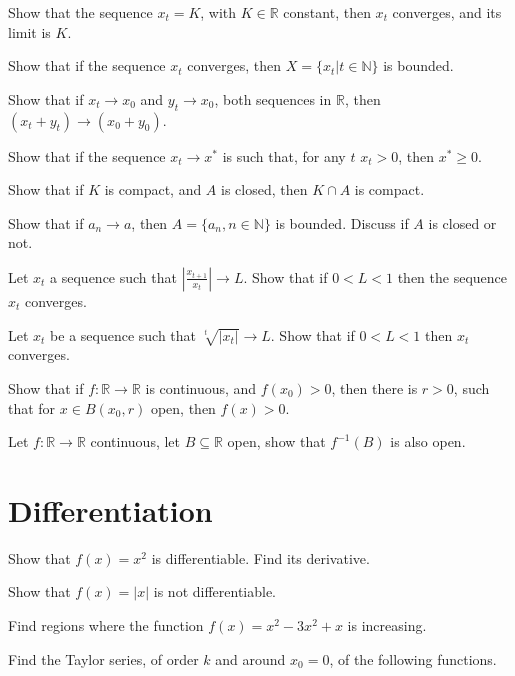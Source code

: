 \documentclass[noanswers]{exam}
\begin{document}
\begin{questions}
\question Show that the sequence $x_t=K$, with $K\in\mathbb{R}$ constant, then $x_t$ converges, and its limit is $K$.

\question Show that if the sequence $x_t$ converges, then $X=\{x_t|t\in\mathbb{N}\} $ is bounded.

\question Show that if $x_t\rightarrow x_0$ and $y_t\rightarrow x_0$, both sequences in $\mathbb{R}$, then $(x_t+y_t)\rightarrow(x_0+y_0)$.

\question Show that if the sequence $x_t\rightarrow x^*$ is such that, for any $t$ $x_t>0$, then $x^*\geq 0$.

\question Show that if $K$ is compact, and $A$ is closed, then $K\cap A$ is compact.

\question Show that if $a_n\rightarrow a$, then $A=\{a_n, n\in\mathbb{N}\}$ is bounded. Discuss if $A$ is closed or not.

\question Let $x_t$ a sequence such that $\left|\frac{x_{t+1}}{x_t}\right|\rightarrow L$. Show that if $0<L<1$ then the sequence $x_t$ converges.

\question Let $x_t$ be a sequence such that $\sqrt[t]{|x_t|}\rightarrow L$. Show that if $0<L<1$ then $x_t$ converges.

\question Show that if $f:\mathbb{R}\rightarrow\mathbb{R}$ is continuous, and $f(x_0)>0$, then there is $r>0$, such that for $x\in B(x_0,r)$ open, then $f(x)>0$.

\question Let $f:\mathbb{R}\rightarrow\mathbb{R}$ continuous, let $B\subseteq\mathbb{R}$ open, show that $f^{-1}(B)$ is also open.

\section*{Differentiation}

\question Show that $f(x)=x^2$ is differentiable. Find its derivative.

\question Show that $f(x)=|x|$ is not differentiable.

\question Find regions where the function $f(x)=x^2-3x^2+x$ is increasing.

\question Find the Taylor series, of order $k$ and around $x_0=0$, of the following functions.

\end{questions}
\end{document}
